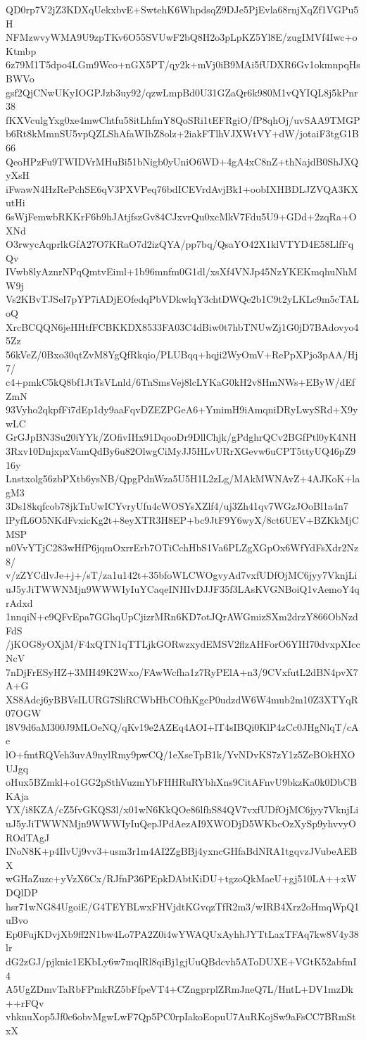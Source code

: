 QD0rp7V2jZ3KDXqUekxbvE+SwtehK6WhpdsqZ9DJe5PjEvla68rnjXqZf1VGPu5H
NFMzwvyWMA9U9zpTKv6O55SVUwF2bQ8H2o3pLpKZ5Yl8E/zugIMVf4Iwc+oKtmbp
6z79M1T5dpo4LGm9Wco+nGX5PT/qy2k+mVj0iB9MAi5fUDXR6Gv1okmnpqHsBWVo
gsf2QjCNwUKyIOGPJzb3uy92/qzwLmpBd0U31GZaQr6k980M1vQYIQL8j5kPnr38
fKXVculgYxg0xe4mwChtfu58itLhfmY8QoSRi1tEFRgiO/fP8qhOj/uvSAA9TMGP
b6Rt8kMmnSU5vpQZLShAfaWIbZ8olz+2iakFTlhVJXWtVY+dW/jotaiF3tgG1B66
QeoHPzFu9TWIDVrMHuBi51bNigb0yUniO6WD+4gA4xC8nZ+thNajdB0ShJXQyXsH
iFwawN4HzRePchSE6qV3PXVPeq76bdICEVrdAvjBk1+oobIXHBDLJZVQA3KXutHi
6sWjFemwbRKKrF6b9hJAtjfszGv84CJxvrQu0xcMkV7Fdu5U9+GDd+2zqRa+OXNd
O3rwycAqprlkGfA27O7KRaO7d2izQYA/pp7bq/QsaYO42X1klVTYD4E58LlfFqQv
IVwb8lyAznrNPqQmtvEiml+1b96mnfm0G1dl/xsXf4VNJp45NzYKEKmqhuNhMW9j
Vs2KBvTJSeI7pYP7iADjEOfedqPbVDkwlqY3chtDWQe2b1C9t2yLKLc9m5cTALoQ
XrcBCQQN6jeHHtfFCBKKDX8533FA03C4dBiw0t7hbTNUwZj1G0jD7BAdovyo45Zz
56kVeZ/0Bxo30qtZvM8YgQfRkqio/PLUBqq+hqji2WyOmV+RePpXPjo3pAA/Hj7/
c4+pmkC5kQ8bf1JtTsVLnld/6TnSmsVej8lcLYKaG0kH2v8HmNWs+EByW/dEfZmN
93Vyho2qkpfFi7dEp1dy9aaFqvDZEZPGeA6+YmimH9iAmqniDRyLwySRd+X9ywLC
GrGJpBN3Su20iYYk/ZOfivIHx91DqooDr9DllChjk/gPdghrQCv2BGfPtl0yK4NH
3Rxv10DnjxpxVamQdBy6u82OlwgCiMyJJ5HLvURrXGevw6uCPT5ttyUQ46pZ916y
Lnstxolg56zbPXtb6ysNB/QpgPdnWza5U5H1L2zLg/MAkMWNAvZ+4AJKoK+lagM3
3Ds18kqfcob78jkTnUwICYvryUfu4cWOSYsXZlf4/uj3Zh41qv7WGzJOoBl1a4n7
lPyfL6O5NKdFvxicKg2t+8eyXTR3H8EP+bc9JtF9Y6wyX/8ct6UEV+BZKkMjCMSP
n0VvYTjC283wHfP6jqmOxrrErb7OTiCchHbS1Va6PLZgXGpOx6WfYdFsXdr2Nz8/
v/zZYCdlvJe+j+/sT/za1u142t+35bfoWLCWOgvyAd7vxfUDfOjMC6jyy7VknjLi
uJ5yJiTWWNMjn9WWWIyIuYCaqeINHIvDJJF35f3LAsKVGNBoiQ1vAemoY4qrAdxd
1nnqiN+e9QFvEpa7GGhqUpCjizrMRn6KD7otJQrAWGmizSXm2drzY866ObNzdFdS
/jKOG8yOXjM/F4xQTN1qTTLjkGORwzxydEMSV2flzAHForO6YIH70dvxpXIccNcV
7nDjFrESyHZ+3MH49K2Wxo/FAwWcfha1z7RyPElA+n3/9CVxfutL2dBN4pvX7A+G
XS8Adcj6yBBVsILURG7SliRCWbHbCOfhKgcP0udzdW6W4mub2m10Z3XTYqR07OGW
l8V9d6aM300J9MLOeNQ/qKv19e2AZEq4AOI+lT4sIBQi0KlP4zCc0JHgNlqT/cAe
lO+fmtRQVeh3uvA9nylRmy9pwCQ/1eXseTpB1k/YvNDvKS7zY1z5ZeBOkHXOUJgq
oHux5BZmkl+o1GG2pSthVuzmYbFHHRuRYbhXns9CitAFnvU9bkzKa0k0DbCBKAja
YX/i8KZA/cZ5fvGKQS3l/x01wN6KkQOe86lfhS84QV7vxfUDfOjMC6jyy7VknjLi
uJ5yJiTWWNMjn9WWWIyIuQepJPdAezAI9XWODjD5WKbcOzXySp9yhvvyOROdTAgJ
INoN8K+p4IlvUj9vv3+usm3r1m4AI2ZgBBj4yxncGHfaBdNRA1tgqvzJVubeAEBX
wGHaZuzc+yVzX6Cx/RJfnP36PEpkDAbtKiDU+tgzoQkMaeU+gj510LA++xWDQlDP
hsr71wNG84UgoiE/G4TEYBLwxFHVjdtKGvqzTfR2m3/wIRB4Xrz2oHmqWpQ1uBvo
Ep0FujKDvjXb9ff2N1bw4Lo7PA2Z0i4wYWAQUxAyhhJYTtLaxTFAq7kw8V4y38lr
dG2zGJ/pjknic1EKbLy6w7mqlRl8qiBj1gjUuQBdcvh5AToDUXE+VGtK52abfmI4
A5UgZDmvTaRbFPmkRZ5bFfpeVT4+CZngprplZRmJneQ7L/HntL+DV1mzDk++rFQv
vhknuXop5Jf0c6obvMgwLwF7Qp5PC0rpIakoEopuU7AuRKojSw9aFsCC7BRmStxX
